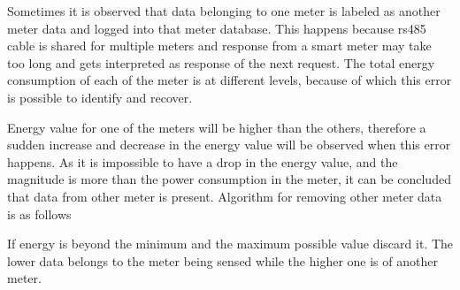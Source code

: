 Sometimes it is observed that data belonging to one meter is labeled as another meter data and logged into that meter database. This happens because rs485 cable is shared for multiple meters and response from a smart meter may take too long and gets interpreted as response of the next request. The total energy consumption of each of the meter is at different levels, because of which this error is possible to identify and recover.

Energy value for one of the meters will be higher than the others, therefore a sudden increase and decrease in the energy value will be observed when this error happens. As it is impossible to have a drop in the energy value, and the magnitude is more than the power consumption in the meter, it can be concluded that data from other meter is present.
Algorithm for removing other meter data is as follows

If energy is beyond the minimum and the maximum possible value discard it. The lower data belongs to the meter being sensed while the higher one is of another meter.
